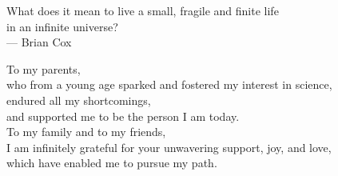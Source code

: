 \cleardoublepage
\thispagestyle{empty}


\vspace*{3cm}

\begin{raggedleft}
    	What does it mean to live a small, fragile and finite life \\
	 in an infinite universe?\\
     --- Brian Cox\\
\end{raggedleft}

\vspace{4cm}

\begin{center}
    To my parents, \\
    who from a young age sparked and fostered my interest in science, \\
    endured all my shortcomings, \\
    and supported me to be the person I am today. \\
    To my family and to my friends, \\
    I am infinitely grateful for your unwavering support, joy, and love, \\
    which have enabled me to pursue my path.
\end{center}


